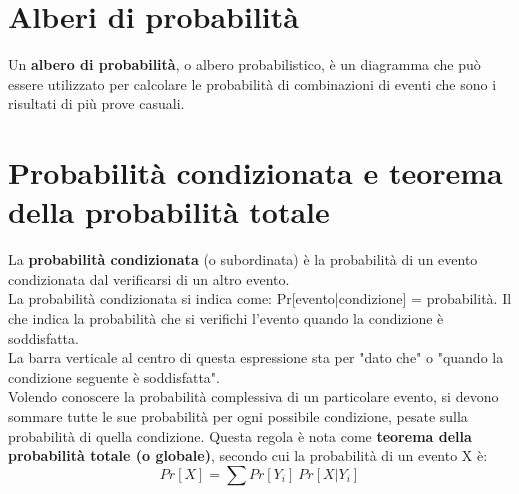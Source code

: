 \documentclass[10pt, draft]{book}
\begin{document}
\section{Alberi di probabilità}
Un \textbf{albero di probabilità}, o albero probabilistico, è un diagramma che può essere utilizzato per calcolare le probabilità di combinazioni di eventi che sono i risultati di più prove casuali.

\section{Probabilità condizionata e teorema della probabilità totale}
La \textbf{probabilità condizionata} (o subordinata) è la probabilità di un evento condizionata dal verificarsi di un altro evento.
\\
La probabilità condizionata si indica come: Pr[evento|condizione] = probabilità.
Il che indica la probabilità che si verifichi l'evento quando la condizione è soddisfatta.
\\
La barra verticale al centro di questa espressione sta per "dato che" o "quando la condizione seguente è soddisfatta".
\\
Volendo conoscere la probabilità complessiva di un particolare evento, si devono sommare tutte le sue probabilità per ogni possibile condizione, pesate sulla probabilità di quella condizione. Questa regola è nota come \textbf{teorema della probabilità totale (o globale)}, secondo cui la probabilità di un evento X è:
\begin{equation}
    Pr[X] = \sum{Pr[Y_i]\ Pr[X | Y_i]}
\end{equation}
\end{document}
